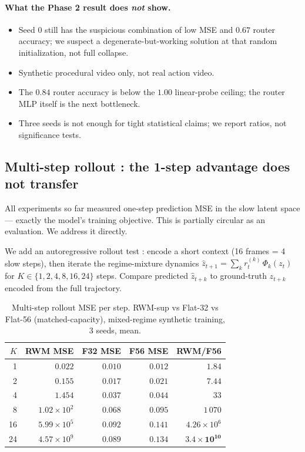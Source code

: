 \documentclass[11pt,a4paper]{article}
\begin{document}
\paragraph{What the Phase 2 result does \emph{not} show.}
\begin{itemize}
\item Seed 0 still has the suspicious combination of low MSE and
  $0.67$ router accuracy; we suspect a degenerate-but-working
  solution at that random initialization, not full collapse.
\item Synthetic procedural video only, not real action video.
\item The $0.84$ router accuracy is below the $1.00$ linear-probe
  ceiling; the router MLP itself is the next bottleneck.
\item Three seeds is not enough for tight statistical claims; we
  report ratios, not significance tests.
\end{itemize}

\subsection{Multi-step rollout : the 1-step advantage does not transfer}
\label{sec:rwm-rollout}

All experiments so far measured one-step prediction MSE in the slow
latent space --- exactly the model's training objective. This is
partially circular as an evaluation. We address it directly.

We add an autoregressive rollout test : encode a short context
(16 frames = 4 slow steps), then iterate the regime-mixture
dynamics $\hat z_{t+1} = \sum_k r_t^{(k)}\, \Phi_k(z_t)$ for
$K \in \{1,2,4,8,16,24\}$ steps. Compare predicted $\hat z_{t+k}$
to ground-truth $z_{t+k}$ encoded from the full trajectory.

\begin{table}[h]
\centering
\caption{Multi-step rollout MSE per step. RWM-sup vs Flat-32 vs
Flat-56 (matched-capacity), mixed-regime synthetic training, 3
seeds, mean.}
\label{tab:rwm-rollout}
\begin{tabular}{rrrrr}
\toprule
$K$ & RWM MSE & F32 MSE & F56 MSE & RWM/F56 \\
\midrule
1 & $0.022$ & $0.010$ & $0.012$ & $1.84$ \\
2 & $0.155$ & $0.017$ & $0.021$ & $7.44$ \\
4 & $1.454$ & $0.037$ & $0.044$ & $33$ \\
8 & $1.02 \times 10^{2}$ & $0.068$ & $0.095$ & $1\,070$ \\
16 & $5.99 \times 10^{5}$ & $0.092$ & $0.141$ & $4.26 \times 10^{6}$ \\
24 & $4.57 \times 10^{9}$ & $0.089$ & $0.134$ & $\bm{3.4 \times 10^{10}}$ \\
\bottomrule
\end{tabular}
\end{table}
\end{document}
